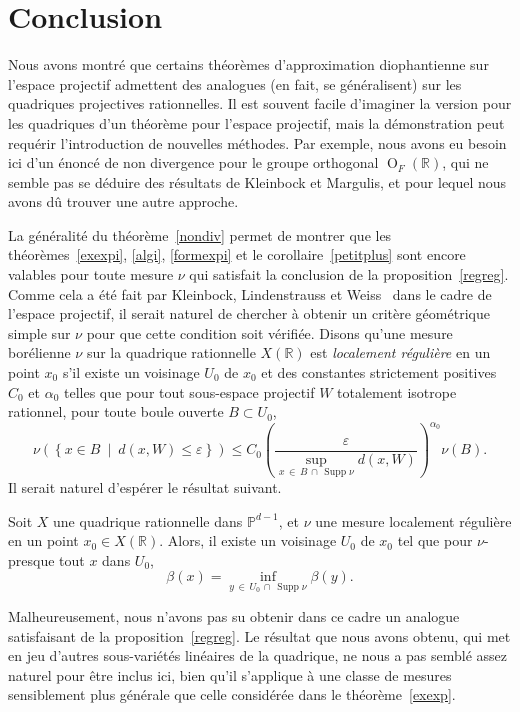 \documentclass[AHL,Unicode,longabstracts,francais,published]{cedram}
\DeclareMathOperator{\GO}{O}
\DeclareMathOperator{\Supp}{Supp}
\newcommand{\R}{\mathbb{R}}
\newcommand{\PP}{\mathbb{P}}
\newcommand{\eps}{\varepsilon}
\begin{document}
\section{Conclusion}

Nous avons montré que certains théorèmes d'approximation diophantienne sur l'espace projectif admettent des analogues (en fait, se généralisent) sur les quadriques projectives rationnelles. Il est souvent facile d'imaginer la version pour les quadriques d'un théorème pour l'espace projectif, mais la démonstration peut requérir l'introduction de nouvelles méthodes. Par exemple, nous avons eu besoin ici d'un énoncé de non divergence pour le groupe orthogonal $\GO_F(\R)$, qui ne semble pas se déduire des résultats de Kleinbock et Margulis, et pour lequel nous avons dû trouver une autre approche.

La généralité du théorème~\ref{nondiv} permet de montrer que les théorèmes~\ref{exexpi}, \ref{algi}, \ref{formexpi} et le corollaire~\ref{petitplus} sont encore valables pour toute mesure $\nu$ qui satisfait la conclusion de la proposition~\ref{regreg}. Comme cela a été fait par Kleinbock, Lindenstrauss et Weiss~\cite{klw} dans le cadre de l'espace projectif, il serait naturel de chercher à obtenir un critère géométrique simple sur $\nu$ pour que cette condition soit vérifiée. Disons qu'une mesure borélienne $\nu$ sur la quadrique rationnelle $X(\R)$ est \emph{localement régulière} en un point $x_0$ s'il existe un voisinage $U_0$ de $x_0$ et des constantes strictement positives $C_0$ et $\alpha_0$ telles que pour tout sous-espace projectif $W$ totalement isotrope rationnel, pour toute boule ouverte $B\subset U_0$,
\[
\nu\left(\left\{x\in B\ \middle|\ d(x,W)\leq\eps\right\}\right) \leq C_0\left(\frac{\eps}{\sup\limits_{x\,\in\,B\,\cap\,\Supp\nu}d(x,W)}\right)^{\alpha_0}\nu(B).
\]
Il serait naturel d'espérer le résultat suivant.

\begin{conj}
Soit $X$ une quadrique rationnelle dans $\PP^{d-1}$, et $\nu$ une mesure localement régulière en un point $x_0\in X(\R)$. Alors, il existe un voisinage $U_0$ de $x_0$ tel que pour $\nu$-presque tout $x$ dans $U_0$,
\[
\beta(x) = \inf_{y\,\in\,U_0\,\cap\,\Supp\nu}\beta(y).
\]
\end{conj}

Malheureusement, nous n'avons pas su obtenir dans ce cadre un analogue satisfaisant de la proposition~\ref{regreg}. Le résultat que nous avons obtenu, qui met en jeu d'autres sous-variétés linéaires de la quadrique, ne nous a pas semblé assez naturel pour être inclus ici, bien qu'il s'applique à une classe de mesures sensiblement plus générale que celle considérée dans le théorème~\ref{exexp}.




\end{document}
